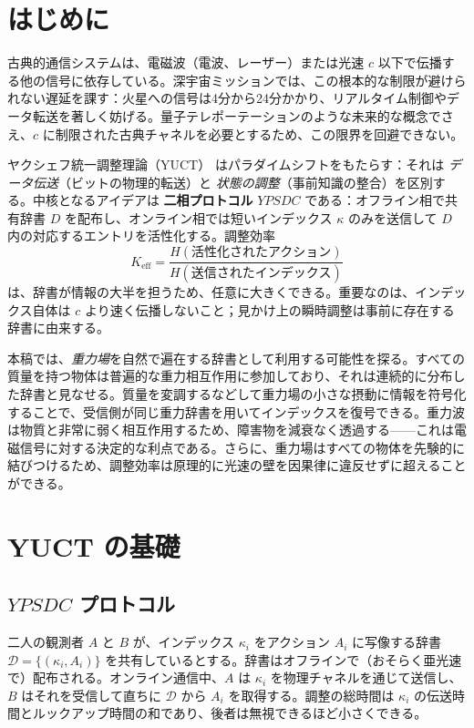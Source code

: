 \documentclass[12pt,a4paper]{article}
\newcommand{\Keff}{K_{\mathrm{eff}}}
\newcommand{\YPSDC}{YPSDC}
\begin{document}
	\tableofcontents
	\newpage
	
	\section{はじめに}
	\label{sec:intro}
	
	古典的通信システムは、電磁波（電波、レーザー）または光速 \(c\) 以下で伝播する他の信号に依存している。深宇宙ミッションでは、この根本的な制限が避けられない遅延を課す：火星への信号は4分から24分かかり、リアルタイム制御やデータ転送を著しく妨げる。量子テレポーテーションのような未来的な概念でさえ、\(c\) に制限された古典チャネルを必要とするため、この限界を回避できない。
	
	ヤクシェフ統一調整理論（YUCT）\cite{Yakushev2026} はパラダイムシフトをもたらす：それは \emph{データ伝送}（ビットの物理的転送）と \emph{状態の調整}（事前知識の整合）を区別する。中核となるアイデアは \textbf{二相プロトコル} \(\YPSDC\) である：オフライン相で共有辞書 \(D\) を配布し、オンライン相では短いインデックス \(\kappa\) のみを送信して \(D\) 内の対応するエントリを活性化する。調整効率
	\begin{equation}
		\Keff = \frac{H(\text{活性化されたアクション})}{H(\text{送信されたインデックス})}
	\end{equation}
	は、辞書が情報の大半を担うため、任意に大きくできる。重要なのは、インデックス自体は \(c\) より速く伝播しないこと；見かけ上の瞬時調整は事前に存在する辞書に由来する。
	
	本稿では、\emph{重力場}を自然で遍在する辞書として利用する可能性を探る。すべての質量を持つ物体は普遍的な重力相互作用に参加しており、それは連続的に分布した辞書と見なせる。質量を変調するなどして重力場の小さな摂動に情報を符号化することで、受信側が同じ重力辞書を用いてインデックスを復号できる。重力波は物質と非常に弱く相互作用するため、障害物を減衰なく透過する——これは電磁信号に対する決定的な利点である。さらに、重力場はすべての物体を先験的に結びつけるため、調整効率は原理的に光速の壁を因果律に違反せずに超えることができる。
	
	\section{YUCT の基礎}
	\label{sec:foundations}
	
	\subsection{\(\YPSDC\) プロトコル}
	\label{subsec:ypsdc}
	
	二人の観測者 \(A\) と \(B\) が、インデックス \(\kappa_i\) をアクション \(A_i\) に写像する辞書 \(\mathcal{D} = \{ (\kappa_i, A_i) \}\) を共有しているとする。辞書はオフラインで（おそらく亜光速で）配布される。オンライン通信中、\(A\) は \(\kappa_i\) を物理チャネルを通じて送信し、\(B\) はそれを受信して直ちに \(\mathcal{D}\) から \(A_i\) を取得する。調整の総時間は \(\kappa_i\) の伝送時間とルックアップ時間の和であり、後者は無視できるほど小さくできる。
	
\end{document}
